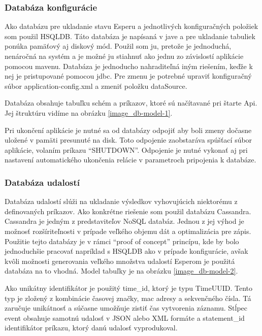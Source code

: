 		\subsubsection{Databáza konfigurácie}
		Ako databázu pre ukladanie stavu Esperu a jednotlivých konfiguračných položiek som použil \ac{HSQLDB}. Táto databáza je napísaná v jave a pre ukladanie tabuliek ponúka pamäťový aj diskový mód. Použil som ju, pretože je jednoduchá, nenáročná na systém a je možné ju stiahnuť ako jednu zo závislostí aplikácie pomocou mavenu. Databáza je jednoducho nahraditeľná iným riešením, keďže k nej je pristupované pomocou jdbc. Pre zmenu je potrebné upraviť konfiguračný súbor application-config.xml a zmeniť položku dataSource.
		
		Databáza obsahuje tabuľku schém a príkazov, ktoré sú načítavané pri štarte Api. Jej štruktúru vidíme na obrázku \ref{image_db-model-1}.
		
		Pri ukončení aplikácie je nutné sa od databázy odpojiť aby boli zmeny dočasne uložené v pamäti presunuté na disk. Toto odpojenie zaobstaráva spúšťací súbor aplikácie, volaním príkazu ``SHUTDOWN''. Odpojenie je nutné vykonať aj pri nastavení automatického ukončenia relácie v parametroch pripojenia k databáze.
		
		\subsubsection{Databáza udalostí}
		Databáza udalostí slúži na ukladanie výsledkov vyhovujúcich niektorému z definovaných príkazov. Ako konkrétne riešenie som použil databázu Cassandra. Cassandra je jedným z predstaviteľov NoSQL databáz. Jednou z jej výhod je možnosť rozšíriteľnosti v prípade veľkého objemu dát a optimalizácia pre zápis. Použitie tejto databázy je v rámci ``proof of concept'' princípu, kde by bolo jednoduchšie pracovať napríklad s HSQLDB ako v prípade konfigurácie, avšak kvôli možnosti generovania veľkého množstva udalostí Esperom je použitá databáza na to vhodná. Model tabuľky je na obrázku \ref{image_db-model-2}.

		Ako unikátny identifikátor je použitý time\_id, ktorý je typu TimeUUID. Tento typ je zložený z kombinácie časovej značky, mac adresy a sekvenčného čísla. Tá zaručuje unikátnosť a súčasne umožňuje zistiť čas vytvorenia záznamu. Stĺpec event obsahuje samotnú udalosť v JSON alebo XML formáte a statement\_id identifikátor príkazu, ktorý danú udalosť vyprodukoval.
	
